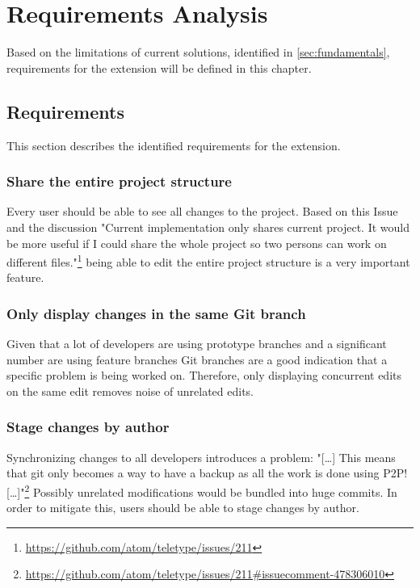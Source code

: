 \chapter{Requirements Analysis}

Based on the limitations of current solutions, identified in \autoref{sec:fundamentals}, requirements for the extension will be defined in this chapter.

\section{Requirements}

This section describes the identified requirements for the extension.

\subsection{Share the entire project structure}

Every user should be able to see all changes to the project.
Based on this Issue and the discussion "Current implementation only shares current project. It would be more useful if I could share the whole project so two persons can work on different files."\footnote{\href{https://github.com/atom/teletype/issues/211}{https://github.com/atom/teletype/issues/211}} being able to edit the entire project structure is a very important feature.

\subsection{Only display changes in the same Git branch}

Given that a lot of developers are using prototype branches and a significant number are using feature branches Git branches are a good indication that a specific problem is being worked on. \cite{PhillipsSillitoWalker:2011:Branching_and_merging} Therefore, only displaying concurrent edits on the same edit removes noise of unrelated edits.

\subsection{Stage changes by author}

Synchronizing changes to all developers introduces a problem:
"[\dots] This means that git only becomes a way to have a backup as all the work is done using P2P! [\dots]"\footnote{\href{https://github.com/atom/teletype/issues/211\#issuecomment-478306010}{https://github.com/atom/teletype/issues/211\#issuecomment-478306010}}
Possibly unrelated modifications would be bundled into huge commits. In order to mitigate this, users should be able to stage changes by author.

